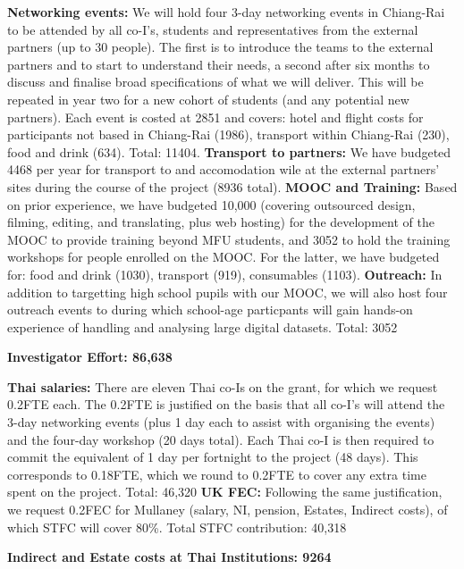 \documentclass[11pt]{article}
\begin{document}
  \noindent
  {\bf Networking events:} We will hold four 3-day networking events in Chiang-Rai to be attended by all co-I's, students and representatives from the external partners (up to 30 people). The first is to introduce the teams to the external partners and to start to understand their needs, a second after six months to discuss and finalise broad specifications of what we will deliver. This will be repeated in year two for a new cohort of students (and any potential new partners). Each event is costed at 2851 and covers: hotel and flight costs for participants not based in Chiang-Rai (1986), transport within Chiang-Rai (230), food and drink (634). Total: 11404. {\bf Transport to partners:} We have budgeted 4468 per year for transport to and accomodation wile at the external partners' sites during the course of the project (8936 total). {\bf MOOC and Training:} Based on prior experience, we have budgeted 10,000 (covering outsourced design, filming, editing, and translating, plus web hosting) for the development of the MOOC to provide training beyond MFU students, and 3052 to hold the training workshops for people enrolled on the MOOC. For the latter, we have budgeted for: food and drink (1030), transport (919), consumables (1103). {\bf Outreach:} In addition to targetting high school pupils with our MOOC, we will also host four outreach events to during which school-age particpants will gain hands-on experience of handling and analysing large digital datasets. Total: 3052
  
  \vspace{3mm}
  \noindent
  {\bf Investigator Effort: 86,638}
  
  \noindent
  {\bf Thai salaries:} There are eleven Thai co-Is on the grant, for which we request 0.2FTE each. The 0.2FTE is justified on the basis that all co-I's will attend the 3-day networking events (plus 1 day each to assist with organising the events) and the four-day workshop (20 days total). Each Thai co-I is then required to commit the equivalent of 1 day per fortnight to the project (48 days). This corresponds to 0.18FTE, which we round to 0.2FTE to cover any extra time spent on the project. Total: 46,320 {\bf UK FEC:} Following the same justification, we request 0.2FEC for Mullaney (salary, NI, pension, Estates, Indirect costs), of which STFC will cover 80\%. Total STFC contribution: 40,318
  
  \vspace{3mm}
  \noindent
  {\bf Indirect and Estate costs at Thai Institutions: 9264}
  
\end{document}
